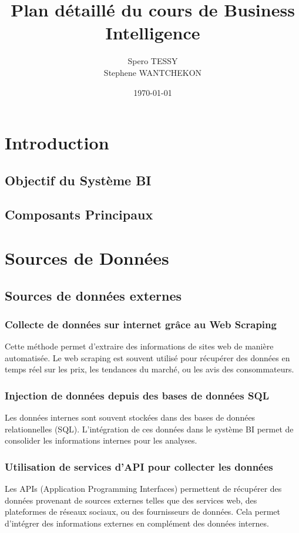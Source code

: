 \documentclass[a4paper,12pt]{report}
\begin{document}
\title{Plan détaillé du cours de Business Intelligence}
\author{Spero TESSY \\ Stephene WANTCHEKON}
\date{\today}
\maketitle

\tableofcontents
\newpage

\chapter{Introduction}
\section{Objectif du Système BI}
\section{Composants Principaux}



\chapter{Sources de Données}
\section{Sources de données externes}
\subsection{Collecte de données sur internet grâce au Web Scraping}
Cette méthode permet d'extraire des informations de sites web de manière automatisée. Le web scraping est souvent utilisé pour récupérer des données en temps réel sur les prix, les tendances du marché, ou les avis des consommateurs.

\subsection{Injection de données depuis des bases de données SQL}
Les données internes sont souvent stockées dans des bases de données relationnelles (SQL). L'intégration de ces données dans le système BI permet de consolider les informations internes pour les analyses.

\subsection{Utilisation de services d'API pour collecter les données}
Les APIs (Application Programming Interfaces) permettent de récupérer des données provenant de sources externes telles que des services web, des plateformes de réseaux sociaux, ou des fournisseurs de données. Cela permet d'intégrer des informations externes en complément des données internes.
\end{document}
